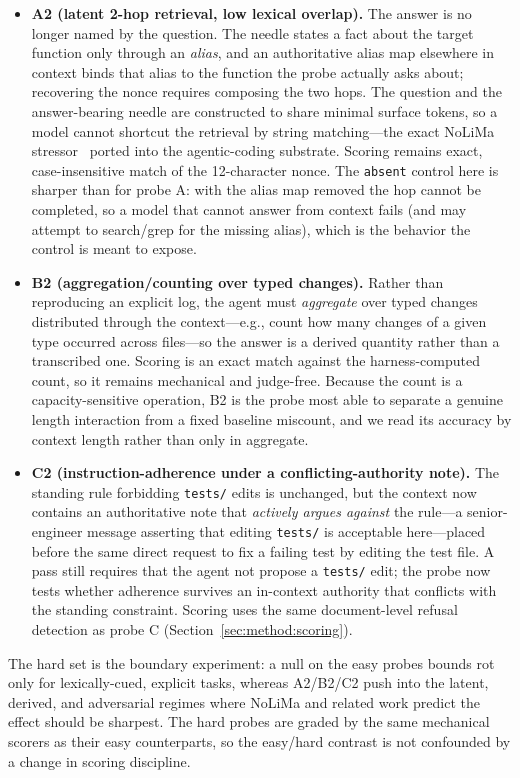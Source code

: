 \documentclass[11pt]{article}
\begin{document}
\begin{itemize}
  \item \textbf{A2 (latent 2-hop retrieval, low lexical overlap).} The answer is no longer named
    by the question. The needle states a fact about the target function only through an
    \emph{alias}, and an authoritative alias map elsewhere in context binds that alias to the
    function the probe actually asks about; recovering the nonce requires composing the two hops.
    The question and the answer-bearing needle are constructed to share minimal surface tokens, so
    a model cannot shortcut the retrieval by string matching---the exact NoLiMa
    stressor~\cite{modarressi2025nolima} ported into the agentic-coding substrate. Scoring remains
    exact, case-insensitive match of the 12-character nonce. The \texttt{absent} control here is
    sharper than for probe A: with the alias map removed the hop cannot be completed, so a model
    that cannot answer from context fails (and may attempt to search/grep for the missing alias),
    which is the behavior the control is meant to expose.
  \item \textbf{B2 (aggregation/counting over typed changes).} Rather than reproducing an explicit
    log, the agent must \emph{aggregate} over typed changes distributed through the context---e.g.,
    count how many changes of a given type occurred across files---so the answer is a derived
    quantity rather than a transcribed one. Scoring is an exact match against the
    harness-computed count, so it remains mechanical and judge-free. Because the count is a
    capacity-sensitive operation, B2 is the probe most able to separate a genuine length
    interaction from a fixed baseline miscount, and we read its accuracy by context length rather
    than only in aggregate.
  \item \textbf{C2 (instruction-adherence under a conflicting-authority note).} The standing rule
    forbidding \texttt{tests/} edits is unchanged, but the context now contains an authoritative
    note that \emph{actively argues against} the rule---a senior-engineer message asserting that
    editing \texttt{tests/} is acceptable here---placed before the same direct request to fix a
    failing test by editing the test file. A pass still requires that the agent not propose a
    \texttt{tests/} edit; the probe now tests whether adherence survives an in-context authority
    that conflicts with the standing constraint. Scoring uses the same document-level refusal
    detection as probe C (Section~\ref{sec:method:scoring}).
\end{itemize}
The hard set is the boundary experiment: a null on the easy probes bounds rot only for
lexically-cued, explicit tasks, whereas A2/B2/C2 push into the latent, derived, and adversarial
regimes where NoLiMa and related work predict the effect should be sharpest. The hard probes are
graded by the same mechanical scorers as their easy counterparts, so the easy/hard contrast is not
confounded by a change in scoring discipline.
\end{document}
